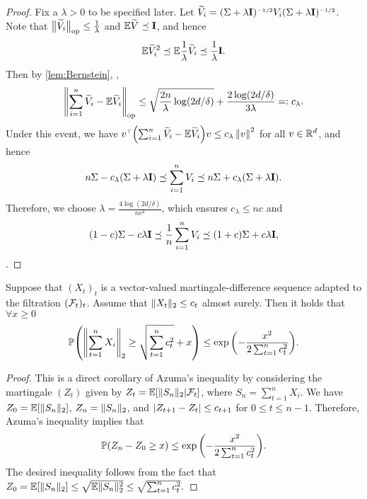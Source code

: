 \begin{proof}
Fix a $\lambda>0$ to be specified later. Let $\widetilde V_i=(\Sigma+\lambda \mathbf{I})^{{\scriptscriptstyle-1/2}} V_i(\Sigma+\lambda \mathbf{I})^{{\scriptscriptstyle-1/2}}$. Note that $\big\|\widetilde V_i\big\|_{\mathrm{op}}\leq \frac{1}{\lambda}$ and $\mathbb{E}{\widetilde V}\preceq \mathbf{I}$, and hence
\begin{align*}
    \mathbb{E}{\widetilde V_i}^2\preceq \mathbb{E}{\frac1\lambda\widetilde V_i}\preceq \frac{1}{\lambda}\mathbf{I}.
\end{align*}
Then by \cref{lem:Bernstein}, \whp,
\begin{align*}
    \left\|\sum_{i=1}^n \widetilde V_i-\mathbb{E}{\widetilde V_i}\right\|_{\rm op}\leq \sqrt{\frac{2n}{\lambda}\log(2d/\delta)}+\frac{2\log(2d/\delta)}{3\lambda}=:c_\lambda.
\end{align*}
Under this event, we have $v^{{\scriptscriptstyle\top}}{\left( \sum_{i=1}^n \widetilde V_i-\mathbb{E}{\widetilde V_i} \right)}v\leq c_\lambda\left\|v\right\|^2$ for all $v\in\mathbb{R}^d$, and hence
\begin{align*}
    n\Sigma-c_\lambda(\Sigma+\lambda\mathbf{I})\preceq \sum_{i=1}^n V_i \preceq n\Sigma+c_\lambda(\Sigma+\lambda\mathbf{I}).
\end{align*}
Therefore, we choose $\lambda=\frac{4\log(2d/\delta)}{nc^2}$, which ensures $c_\lambda\leq nc$ and
\begin{align*}
    (1-c)\Sigma-c\lambda\mathbf{I} \preceq \frac1n\sum_{i=1}^n V_i\preceq (1+c)\Sigma+c\lambda\mathbf{I},
\end{align*}
\whp.
\end{proof}

\begin{lemma}\label{lem:vec-Hoeffding}
Suppose that $(X_t)_t$ is a vector-valued martingale-difference sequence adapted to the filtration $(\mathcal{F}_t)_{t}$. Assume that $\lVert X_t\rVert_2\leq c_t$ almost surely. Then it holds that $\forall x\geq 0$
\begin{align*}
    \mathbb{P}{\left( \left\|\sum_{t=1}^n X_i\right\|_2\geq \sqrt{\sum_{t=1}^nc_t^2}+x \right)}\leq \exp{\left( -\frac{x^2}{2\sum_{t=1}^nc_t^2} \right)}.
\end{align*}
\end{lemma}

\begin{proof}
This is a direct corollary of Azuma's inequality by considering the martingale $(Z_t)$ given by $Z_t=\mathbb{E}[\lVert S_n\rVert_2|\mathcal{F}_t]$, where $S_n=\sum_{t=1}^n X_i$. We have $Z_0=\mathbb{E}[\lVert S_n\rVert_2]$, $Z_n=\lVert S_n\rVert_2$, and $\left|Z_{t+1}-Z_t\right|\leq c_{t+1}$ for $0\leq t\leq n-1$. Therefore, Azuma's inequality implies that
\begin{align*}
    \mathbb{P}{\left( Z_n-Z_0\geq x \right)}\leq \exp{\left( -\frac{x^2}{2\sum_{t=1}^nc_t^2} \right)}.
\end{align*}
The desired inequality follows from the fact that $Z_0=\mathbb{E}[\lVert S_n\rVert_2]\leq \sqrt{\mathbb{E}\lVert S_n\rVert_2^2}\leq \sqrt{\sum_{t=1}^nc_t^2}.$
\end{proof}



